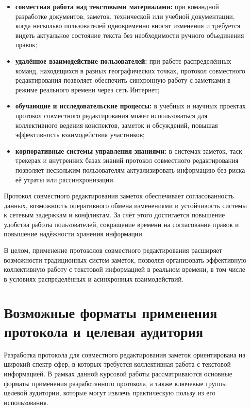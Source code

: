 \begin{itemize}
    \item \textbf{совместная работа над текстовыми материалами:}
    при командной разработке документов, заметок, технической или учебной документации, когда несколько пользователей одновременно вносят изменения и требуется видеть актуальное состояние текста без необходимости ручного объединения правок;
    \item \textbf{удалённое взаимодействие пользователей:}
    при работе распределённых команд, находящихся в разных географических точках, протокол совместного редактирования позволяет обеспечить синхронную работу с заметками в режиме реального времени через сеть Интернет;
    \item \textbf{обучающие и исследовательские процессы:}
    в учебных и научных проектах протокол совместного редактирования может использоваться для коллективного ведения конспектов, заметок и обсуждений, повышая эффективность взаимодействия участников;
    \item \textbf{корпоративные системы управления знаниями:}
    в системах заметок, таск-трекерах и внутренних базах знаний протокол совместного редактирования позволяет нескольким пользователям актуализировать информацию без риска её утраты или рассинхронизации.
\end{itemize}

Протокол совместного редактирования заметок обеспечивает согласованность данных, возможность оперативного обмена изменениями и устойчивость системы к сетевым задержкам и конфликтам. За счёт этого достигается повышение удобства работы пользователей, сокращение времени на согласование правок и повышение надёжности хранения информации.

В целом, применение протоколов совместного редактирования расширяет возможности традиционных систем заметок, позволяя организовать эффективную коллективную работу с текстовой информацией в реальном времени, в том числе в условиях распределённых и асинхронных взаимодействий.

\section{Возможные форматы применения протокола и целевая аудитория}

Разработка протокола для совместного редактирования заметок ориентирована на широкий спектр сфер, в которых требуется коллективная работа с текстовой информацией. В рамках данной курсовой работы рассматриваются основные форматы применения разработанного протокола, а также ключевые группы целевой аудитории, которые могут извлечь практическую пользу из его использования.

